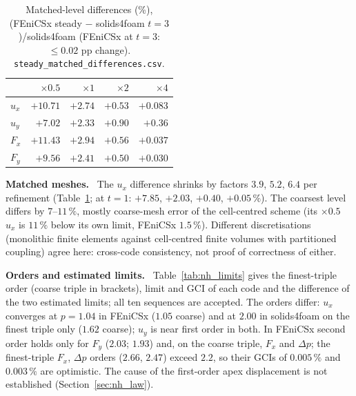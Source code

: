 \documentclass[sn-mathphys,Numbered]{sn-jnl}
\renewcommand{\paragraph}[1]{\par\vspace{0.3\baselineskip}\noindent\textbf{#1}\ }
\newcommand{\FE}{FEniCSx}
\begin{document}
\begin{table}[!ht]
\centering
\caption{Matched-level differences (\%), (\FE{} steady $-$ solids4foam $t=3$)/solids4foam (\FE{} at $t=3$: $\le0.02$ pp change). \texttt{steady\_matched\_differences.csv}.}\label{tab:nh_matched}
\footnotesize
\begin{tabular}{@{}lrrrr@{}}
\toprule
 & $\times0.5$ & $\times1$ & $\times2$ & $\times4$ \\
\midrule
$u_x$ & $+10.71$ & $+2.74$ & $+0.53$ & $+0.083$ \\
$u_y$ & $+7.02$ & $+2.33$ & $+0.90$ & $+0.36$ \\
$F_x$ & $+11.43$ & $+2.94$ & $+0.56$ & $+0.037$ \\
$F_y$ & $+9.56$ & $+2.41$ & $+0.50$ & $+0.030$ \\
\bottomrule
\end{tabular}
\end{table}

\paragraph{Matched meshes.}
The $u_x$ difference shrinks by factors $3.9$, $5.2$, $6.4$ per refinement (Table~\ref{tab:nh_matched}; at $t=1$: $+7.85$, $+2.03$, $+0.40$, $+0.05\,\%$). The coarsest level differs by $7$--$11\,\%$, mostly coarse-mesh error of the cell-centred scheme (its $\times0.5$ $u_x$ is $11\,\%$ below its own limit, \FE{} $1.5\,\%$). Different discretisations (monolithic finite elements against cell-centred finite volumes with partitioned coupling) agree here: cross-code consistency, not proof of correctness of either.

\paragraph{Orders and estimated limits.}
Table~\ref{tab:nh_limits} gives the finest-triple order (coarse triple in brackets), limit and GCI of each code and the difference of the two estimated limits; all ten sequences are accepted. The orders differ: $u_x$ converges at $p=1.04$ in \FE{} ($1.05$ coarse) and at $2.00$ in solids4foam on the finest triple only ($1.62$ coarse); $u_y$ is near first order in both. In \FE{} second order holds only for $F_y$ ($2.03$; $1.93$) and, on the coarse triple, $F_x$ and $\Delta p$; the finest-triple $F_x$, $\Delta p$ orders ($2.66$, $2.47$) exceed $2.2$, so their GCIs of $0.005\,\%$ and $0.003\,\%$ are optimistic. The cause of the first-order apex displacement is not established (Section~\ref{sec:nh_law}).
\end{document}
